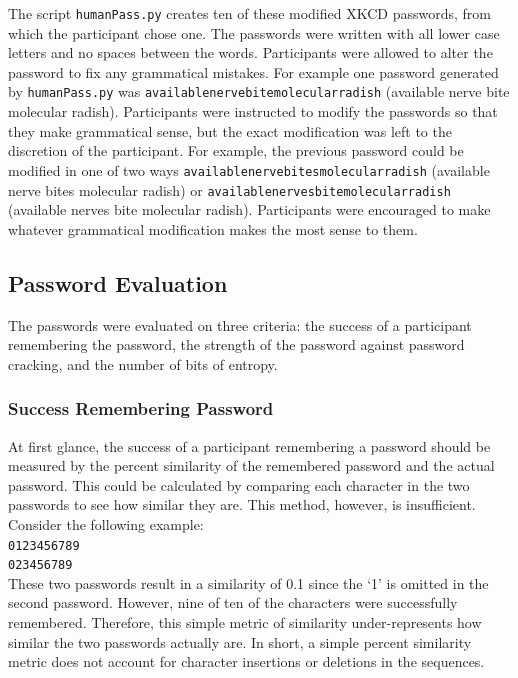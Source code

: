 \documentclass{article}
\begin{document}
The script \texttt{humanPass.py} creates ten of these modified XKCD passwords, from which the participant chose one. The passwords were written with all lower case letters and no spaces between the words. Participants were allowed to alter the password to fix any grammatical mistakes. For example one password generated by \texttt{humanPass.py} was \texttt{availablenervebitemolecularradish} (available nerve bite molecular radish). Participants were instructed to modify the passwords so that they make grammatical sense, but the exact modification was left to the discretion of the participant. For example, the previous password could be modified in one of two ways \texttt{availablenervebitesmolecularradish} (available nerve bites molecular radish) or \texttt{availablenervesbitemolecularradish} (available nerves bite molecular radish). Participants were encouraged to make whatever grammatical modification makes the most sense to them.

\subsection*{Password Evaluation}
The passwords were evaluated on three criteria: the success of a participant remembering the password, the strength of the password against password cracking, and the number of bits of entropy.
\subsubsection*{Success Remembering Password}
At first glance, the success of a participant remembering a password should be measured by the percent similarity of the remembered password and the actual password. This could be calculated by comparing each character in the two passwords to see how similar they are. This method, however, is insufficient. Consider the following example:\\


\noindent\texttt{0123456789}\\
\texttt{023456789} \\

These two passwords result in a similarity of 0.1 since the `1' is omitted in the second password. However, nine of ten of the characters were successfully remembered. Therefore, this simple metric of similarity under-represents how similar the two passwords actually are. In short, a simple percent similarity metric does not account for character insertions or deletions in the sequences.
\end{document}
